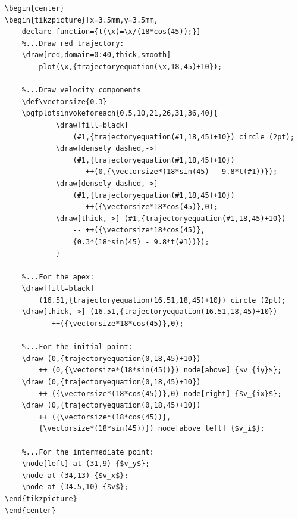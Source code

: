 \documentclass[12pt]{article}
\begin{document}
\begin{lstlisting}
\begin{center}
\begin{tikzpicture}[x=3.5mm,y=3.5mm,
    declare function={t(\x)=\x/(18*cos(45));}]
    %...Draw red trajectory:
    \draw[red,domain=0:40,thick,smooth] 
        plot(\x,{trajectoryequation(\x,18,45)+10});

    %...Draw velocity components
    \def\vectorsize{0.3}
    \pgfplotsinvokeforeach{0,5,10,21,26,31,36,40}{
            \draw[fill=black] 
                (#1,{trajectoryequation(#1,18,45)+10}) circle (2pt);
            \draw[densely dashed,->] 
                (#1,{trajectoryequation(#1,18,45)+10}) 
                -- ++(0,{\vectorsize*(18*sin(45) - 9.8*t(#1))});
            \draw[densely dashed,->] 
                (#1,{trajectoryequation(#1,18,45)+10}) 
                -- ++({\vectorsize*18*cos(45)},0);
            \draw[thick,->] (#1,{trajectoryequation(#1,18,45)+10}) 
                -- ++({\vectorsize*18*cos(45)},
                {0.3*(18*sin(45) - 9.8*t(#1))});
            }

    %...For the apex:
    \draw[fill=black] 
        (16.51,{trajectoryequation(16.51,18,45)+10}) circle (2pt);
    \draw[thick,->] (16.51,{trajectoryequation(16.51,18,45)+10}) 
        -- ++({\vectorsize*18*cos(45)},0);

    %...For the initial point:
    \draw (0,{trajectoryequation(0,18,45)+10}) 
        ++ (0,{\vectorsize*(18*sin(45))}) node[above] {$v_{iy}$};
    \draw (0,{trajectoryequation(0,18,45)+10}) 
        ++ ({\vectorsize*(18*cos(45))},0) node[right] {$v_{ix}$};
    \draw (0,{trajectoryequation(0,18,45)+10}) 
        ++ ({\vectorsize*(18*cos(45))},
        {\vectorsize*(18*sin(45))}) node[above left] {$v_i$};

    %...For the intermediate point:
    \node[left] at (31,9) {$v_y$};
    \node at (34,13) {$v_x$};
    \node at (34.5,10) {$v$};
\end{tikzpicture}
\end{center}
\end{lstlisting}

\end{document}

